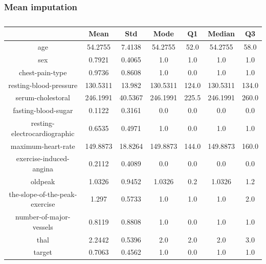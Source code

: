 \documentclass{classrep}
\begin{document}
{{            \subsubsection{Mean imputation}
            \label{results:30-percent:mean-input} {
                \begin{table}[!htbp]
                    \centering
                    \begin{tabular}{|c|c|c|c|c|c|c|}
                        \hline
                        & Mean & Std & Mode & Q1 & Median & Q3 \\ \hline
                        age & 54.2755 & 7.4138 & 54.2755 & 52.0 & 54.2755 & 58.0 \\ \hline
                        sex & 0.7921 & 0.4065 & 1.0 & 1.0 & 1.0 & 1.0 \\ \hline
                        chest-pain-type & 0.9736 & 0.8608 & 1.0 & 0.0 & 1.0 & 1.0 \\ \hline
                        resting-blood-pressure & 130.5311 & 13.982 & 130.5311 & 124.0 & 130.5311 & 134.0 \\ \hline
                        serum-cholestoral & 246.1991 & 40.5367 & 246.1991 & 225.5 & 246.1991 & 260.0 \\ \hline
                        fasting-blood-sugar & 0.1122 & 0.3161 & 0.0 & 0.0 & 0.0 & 0.0 \\ \hline
                        resting-electrocardiographic & 0.6535 & 0.4971 & 1.0 & 0.0 & 1.0 & 1.0 \\ \hline
                        maximum-heart-rate & 149.8873 & 18.8264 & 149.8873 & 144.0 & 149.8873 & 160.0 \\ \hline
                        exercise-induced-angina & 0.2112 & 0.4089 & 0.0 & 0.0 & 0.0 & 0.0 \\ \hline
                        oldpeak & 1.0326 & 0.9452 & 1.0326 & 0.2 & 1.0326 & 1.2 \\ \hline
                        the-slope-of-the-peak-exercise & 1.297 & 0.5733 & 1.0 & 1.0 & 1.0 & 2.0 \\ \hline
                        number-of-major-vessels & 0.8119 & 0.8808 & 1.0 & 0.0 & 1.0 & 1.0 \\ \hline
                        thal & 2.2442 & 0.5396 & 2.0 & 2.0 & 2.0 & 3.0 \\ \hline
                        target & 0.7063 & 0.4562 & 1.0 & 0.0 & 1.0 & 1.0 \\ \hline
                    \end{tabular}
                    \caption{}
                    \label{result_30_Mean-imputation}
                \end{table}
                \FloatBarrier

}}}
\end{document}
